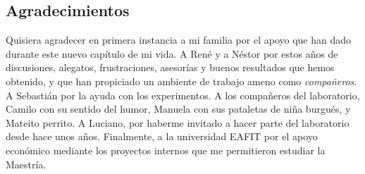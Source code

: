 \portada 
\thispagestyle{empty}

\newpage\null\thispagestyle{empty}\newpage

\contraportada
\thispagestyle{empty}
\newpage\null\thispagestyle{empty}\newpage

\thispagestyle{empty}
\newpage

%	

\dedicatoria
\newpage\null\thispagestyle{empty}\newpage

\licencia
{}
\newpage\null\thispagestyle{empty}\newpage


%	


\cleardoublepage
\begin{center}
\section*{Agradecimientos}
\end{center}
Quisiera agradecer en primera instancia a mi familia por el apoyo que han dado durante este nuevo capítulo de mi vida. A René y a Néstor por estos años de discusiones, alegatos, frustraciones, asesorías y buenos resultados que hemos obtenido, y que han propiciado un ambiente de trabajo ameno como \textit{compañeros}. A Sebastián por la ayuda con los experimentos. A los compañeros del laboratorio, Camilo con su sentido del humor, Manuela con sus pataletas de niña burgués, y Mateito perrito. A Luciano, por haberme invitado a hacer parte del laboratorio desde hace unos años. Finalmente, a la universidad EAFIT por el apoyo económico mediante los proyectos internos que me permitieron estudiar la Maestría.
\newpage\null\thispagestyle{empty}\newpage

\begin{abstract}
	
\end{abstract}
